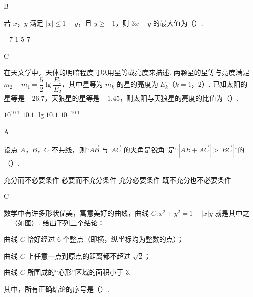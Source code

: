 \begin{answer}
B
\end{answer}



\begin{problem}
若 \(x\)，\(y\) 满足 \(\left|x\right|\le1-y\)，且 \(y\ge-1\)，则 \(3x+y\) 的最大值为（\quad）.

\choices
    {\(-7\)}
    {\(1\)}
    {\(5\)}
    {\(7\)}
\end{problem}

\begin{answer}
C
\end{answer}



\begin{problem}
在天文学中，天体的明暗程度可以用星等或亮度来描述. 两颗星的星等与亮度满足 \(m_2-m_1=\dfrac52\lg\dfrac{E_1}{E_2}\)，其中星等为 \(m_k\) 的星的亮度为 \(E_k\)（\(k=1\)，\(2\)）. 已知太阳的星等是 \(-26.7\)，天狼星的星等是 \(-1.45\)，则太阳与天狼星的亮度的比值为（\quad）.

\choices
    {\(10^{10.1}\)}
    {\(10.1\)}
    {\(\lg10.1\)}
    {\(10^{-10.1}\)}
\end{problem}

\begin{answer}
A
\end{answer}



\begin{problem}
设点 \(A\)，\(B\)，\(C\) 不共线，则“\(\overrightarrow{AB}\) 与 \(\overrightarrow{AC}\) 的夹角是锐角”是“\(\left|\overrightarrow{AB}+\overrightarrow{AC}\right|>\left|\overrightarrow{BC}\right|\)”的（\quad）.

\choices
    {充分而不必要条件}
    {必要而不充分条件}
    {充分必要条件}
    {既不充分也不必要条件}
\end{problem}

\begin{answer}
C
\end{answer}



\begin{problem}
数学中有许多形状优美，寓意美好的曲线，曲线 \(C:x^2+y^2=1+\left|x\right|y\) 就是其中之一（如图）. 给出下列三个结论：


\begin{circlelist}
\item 曲线 \(C\) 恰好经过 \(6\) 个整点（即横，纵坐标均为整数的点）；

\item 曲线 \(C\) 上任意一点到原点的距离都不超过 \(\sqrt2\)；

\item 曲线 \(C\) 所围成的“心形”区域的面积小于 \(3\).
\end{circlelist}
其中，所有正确结论的序号是（\quad）.

\choices
    {}
    {}
    {}
    {}
\end{problem}


